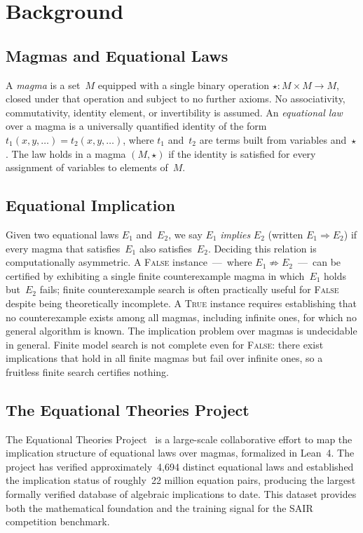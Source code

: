 \documentclass[11pt]{article}
\begin{document}
\section{Background}
\label{sec:background}

\subsection{Magmas and Equational Laws}

A \emph{magma} is a set~$M$ equipped with a single binary operation
${\star} : M \times M \to M$, closed under that operation and subject
to no further axioms. No associativity, commutativity, identity
element, or invertibility is assumed. An \emph{equational law} over a
magma is a universally quantified identity of the form
$t_1(x, y, \ldots) = t_2(x, y, \ldots)$, where $t_1$ and~$t_2$ are
terms built from variables and~$\star$. The law holds in a magma
$(M,\star)$ if the identity is satisfied for every assignment of
variables to elements of~$M$.

\subsection{Equational Implication}

Given two equational laws $E_1$ and~$E_2$, we say $E_1$ \emph{implies}
$E_2$ (written $E_1 \Rightarrow E_2$) if every magma that
satisfies~$E_1$ also satisfies~$E_2$. Deciding this relation is
computationally asymmetric. A \textsc{False} instance~---~where
$E_1 \not\Rightarrow E_2$~---~can be certified by exhibiting a single
finite counterexample magma in which~$E_1$ holds but~$E_2$ fails; finite
counterexample search is often practically useful for \textsc{False}
despite being theoretically incomplete. A \textsc{True}
instance requires establishing that no counterexample exists among all
magmas, including infinite ones, for which no general algorithm is
known. The implication problem over magmas is undecidable in general. Finite
model search is not complete even for \textsc{False}: there exist
implications that hold in all finite magmas but fail over infinite
ones, so a fruitless finite search certifies nothing.

\subsection{The Equational Theories Project}

The Equational Theories Project~\citep{tao2025etp} is a large-scale
collaborative effort to map the implication structure of equational laws
over magmas, formalized in Lean~4. The project has verified
approximately~4{,}694 distinct equational laws and established the
implication status of roughly~22 million equation pairs, producing the
largest formally verified database of algebraic implications to date.
This dataset provides both the mathematical foundation and the training
signal for the SAIR competition benchmark.
\end{document}
